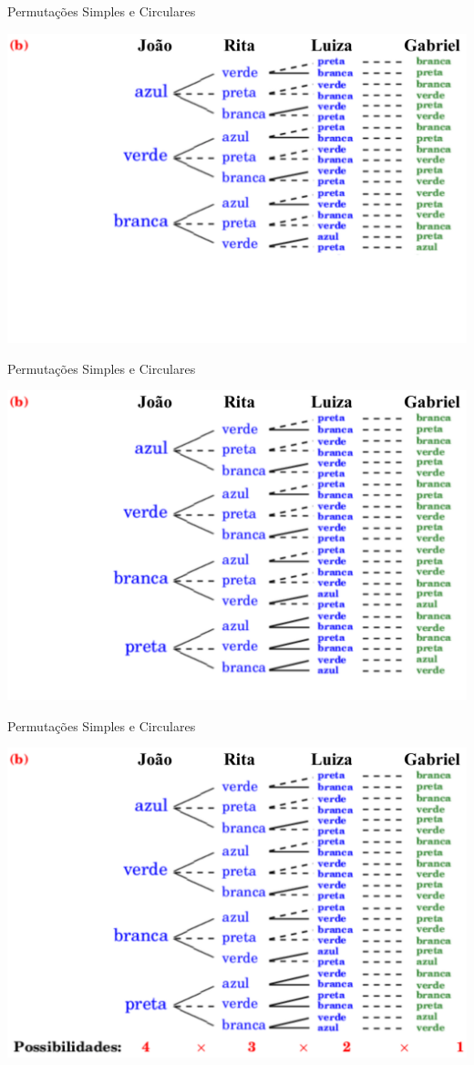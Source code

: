 \documentclass[aspectratio=169]{beamer}
\begin{document}
\begin{frame}{Permutações Simples e Circulares}
    \begin{center}
        \includegraphics[width=0.71\linewidth]{figs/Exemplo1b_4.png}
    \end{center}
\end{frame}

\begin{frame}{Permutações Simples e Circulares}
    \begin{center}
        \includegraphics[width=0.71\linewidth]{figs/Exemplo1b_5.png}
    \end{center}
\end{frame}

\begin{frame}{Permutações Simples e Circulares}
    \begin{center}
        \includegraphics[width=0.71\linewidth]{figs/Exemplo1b_6.png}
    \end{center}
\end{frame}
\end{document}
